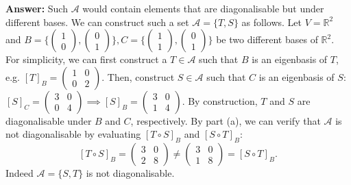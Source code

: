 \documentclass{article}
\begin{document}
\begin{itemize}
\begin{itemize}
		            \textbf{Answer: } Such $\mathcal{A}$ would contain elements that are diagonalisable but under different bases. We can construct such a set $\mathcal{A}=\{T,S\}$ as follows. Let $V=\mathbb{R}^2$ and $B=\{\begin{pmatrix}1\\0\end{pmatrix},\begin{pmatrix}0\\1\end{pmatrix}\},C=\{\begin{pmatrix}1\\1\end{pmatrix},\begin{pmatrix}0\\1\end{pmatrix}\}$ be two different bases of $\mathbb{R}^2$. For simplicity, we can first construct a $T\in\mathcal{A}$ such that $B$ is an eigenbasis of $T$, e.g. $[T]_B=\begin{pmatrix}1&0\\0&2\end{pmatrix}$. Then, construct $S\in\mathcal{A}$ such that $C$ is an eigenbasis of $S$: $[S]_C=\begin{pmatrix}3&0\\0&4\end{pmatrix}\implies [S]_B=\begin{pmatrix}3&0\\1&4\end{pmatrix}$. By construction, $T$ and $S$ are diagonalisable under $B$ and $C$, respectively. By part (a), we can verify that $\mathcal{A}$ is not diagonalisable by evaluating $[T\circ S]_B$ and $[S\circ T]_B$: \[[T\circ S]_B=\begin{pmatrix}3&0\\2&8\end{pmatrix}\neq\begin{pmatrix}3&0\\1&8\end{pmatrix}=[S\circ T]_B.\] Indeed $\mathcal{A}=\{S,T\}$ is not diagonalisable.
	      \end{itemize}
\end{itemize}
\end{document}
